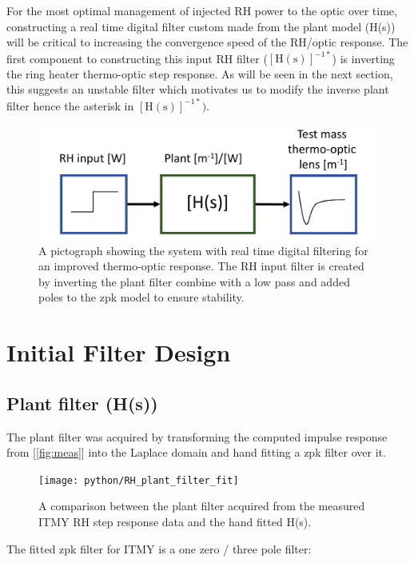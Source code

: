 \documentclass[colorlinks=true,pdfstartview=FitV,linkcolor=blue,
            citecolor=magenta,urlcolor=red]{ligodoc}
\begin{document}
For the most optimal management of injected RH power to the optic over time, constructing a real time digital filter custom made from the plant model (H(s)) will be critical to increasing the convergence speed of the RH/optic response. The first component to constructing this input RH filter ($[\mathrm{H}(\mathrm{s})]^{-1*}$) is inverting the ring heater thermo-optic step response. As will be seen in the next section, this suggests an unstable filter which motivates us to modify the inverse plant filter hence the asterisk in $[\mathrm{H}(\mathrm{s})]^{-1*})$.

\begin{figure}[H]
\includegraphics[page=2,width=\textwidth]{RH_input_filter_figures.pdf}
\caption{A pictograph showing the system with real time digital filtering for an improved thermo-optic response. The RH input filter is created by inverting the plant filter combine with a low pass and added poles to the zpk model to ensure stability. }
\label{fig:plantwfilt}
\end{figure}



\section{Initial Filter Design}
\subsection{Plant filter (H(s))}

The plant filter was acquired by transforming the computed impulse response from [\ref{fig:meas}] into the Laplace domain and hand fitting a zpk filter over it.

\begin{figure}[H]
\texttt{[image: python/RH\_plant\_filter\_fit]}
\caption{A comparison between the plant filter acquired from the measured ITMY RH step response data and the hand fitted H(s).}
\label{fig:plantfilt}
\end{figure}

The fitted zpk filter for ITMY is a one zero / three pole filter:
\end{document}
